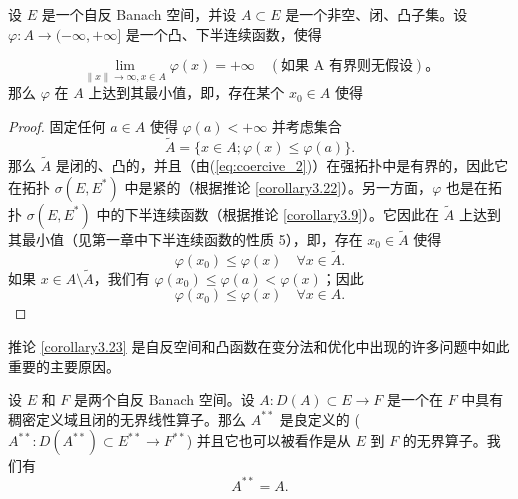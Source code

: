 \begin{corollary}\label{corollary3.23}
设 $E$ 是一个自反 Banach 空间，并设 $A \subset E$ 是一个非空、闭、凸子集。设 $\varphi: A \to (-\infty, +\infty]$ 是一个凸、下半连续函数，使得
\end{corollary}
\begin{equation}\label{eq:coercive_2}
\lim_{\|x\| \to \infty, x \in A} \varphi(x) = +\infty \quad (\text{如果 A 有界则无假设})。
\end{equation}
那么 $\varphi$ 在 $A$ 上达到其最小值，即，存在某个 $x_0 \in A$ 使得


\begin{proof}
固定任何 $a \in A$ 使得 $\varphi(a) < +\infty$ 并考虑集合
\[ \tilde{A} = \{ x \in A; \varphi(x) \le \varphi(a) \}. \]
那么 $\tilde{A}$ 是闭的、凸的，并且（由(\ref{eq:coercive_2})）在强拓扑中是有界的，因此它在拓扑 $\sigma(E, E^*)$ 中是紧的（根据推论 \ref{corollary3.22}）。另一方面，$\varphi$ 也是在拓扑 $\sigma(E, E^*)$ 中的下半连续函数（根据推论 \ref{corollary3.9}）。它因此在 $\tilde{A}$ 上达到其最小值（见第一章中下半连续函数的性质 5），即，存在 $x_0 \in \tilde{A}$ 使得
\[ \varphi(x_0) \le \varphi(x) \quad \forall x \in \tilde{A}. \]
如果 $x \in A \setminus \tilde{A}$，我们有 $\varphi(x_0) \le \varphi(a) < \varphi(x)$；因此
\[ \varphi(x_0) \le \varphi(x) \quad \forall x \in A. \]
\end{proof}

\begin{remark}\label{remark3.18}
推论 \ref{corollary3.23} 是自反空间和凸函数在变分法和优化中出现的许多问题中如此重要的主要原因。
\end{remark}

\begin{theorem}\label{theorem3.24}
设 $E$ 和 $F$ 是两个自反 Banach 空间。设 $A: D(A) \subset E \to F$ 是一个在 $F$ 中具有稠密定义域且闭的无界线性算子。那么 $A^{**}$ 是良定义的 ($A^{**}: D(A^{**}) \subset E^{**} \to F^{**}$) 并且它也可以被看作是从 $E$ 到 $F$ 的无界算子。我们有
\[ A^{**} = A. \]
\end{theorem}

